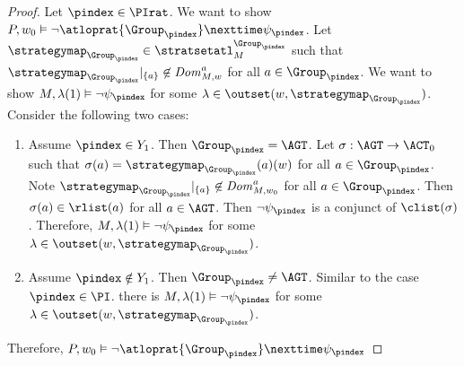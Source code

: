 \begin{proof}
  Let $\pindex\in \PIrat$. We want to show $P,w_0\vDash \neg \atloprat{\Group_\pindex}\nexttime \psi_\pindex $. Let $\strategymap_{\Group_\pindex}\in \stratsetatl^{\Group_\pindex}_{M}$ such that $\strategymap_{\Group_\pindex}|_{\{a\}}\not \in \mathit{Dom}_{M,w}^a$ for all $a \in \Group_\pindex$. We want to show $M,\lambda(1)\vDash \neg \psi_\pindex$ for some $\lambda\in \outset(w, \strategymap_{\Group_\pindex})$. Consider the following two cases:
  \begin{enumerate}[label={Case \arabic*}]
  \item Assume $\pindex\in Y_1$. Then $\Group_\pindex=\AGT$. Let $\sigma: \AGT \to \ACT_0$ such that $\sigma(a)=\strategymap_{\Group_\pindex}(a)(w)$ for all $a \in \Group_\pindex$. Note $\strategymap_{\Group_\pindex}|_{\{a\}}\not \in \mathit{Dom}_{M,w_0}^a$ for all $a \in \Group_\pindex$. Then $\sigma(a)\in \rlist(a)$ for all $a\in \AGT$. Then $\neg \psi_\pindex$ is a conjunct of $\clist(\sigma)$. Therefore, $M,\lambda(1)\vDash \neg \psi_\pindex$ for some $\lambda\in \outset(w, \strategymap_{\Group_\pindex})$.
  \item Assume $\pindex\notin Y_1$. Then $\Group_\pindex\neq \AGT$. Similar to the case $\pindex\in \PI$. there is $M,\lambda(1)\vDash \neg \psi_\pindex$ for some $\lambda\in \outset(w, \strategymap_{\Group_\pindex})$.
  \end{enumerate}
  Therefore, $P,w_0\vDash \neg \atloprat{\Group_\pindex}\nexttime \psi_\pindex $
\end{proof}


